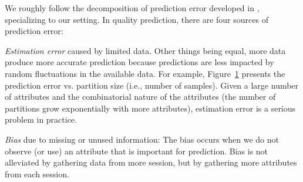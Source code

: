 \label{subsec:challenges}

We roughly follow the decomposition of prediction error developed in \cite{domingos2000unified}, specializing to our setting.  In quality prediction, there are four sources of prediction error:

\begin{packedenumerate}
\item \emph{Estimation error} caused by limited data.  Other
  things being equal, more data produce more accurate prediction because predictions are less impacted by random fluctuations in the available data. For
  example, Figure~\ref{fig:group-size-impact} presents the prediction
  error vs. partition size (i.e., number of samples). Given a large number
  of attributes and the combinatorial nature of the attributes (the
  number of partitions grow exponentially with more attributes),
  estimation error is a serious problem in practice.


\begin{figure}[h!]
\centering
{}
\label{fig:group-size-impact}
\end{figure}

\item \emph{Bias} due to missing or unused information: The bias
  occurs when we do not observe (or use) an attribute that is
  important for prediction. Bias is not alleviated by gathering data
  from more session, but by gathering more attributes from each
  session.


\end{packedenumerate}
